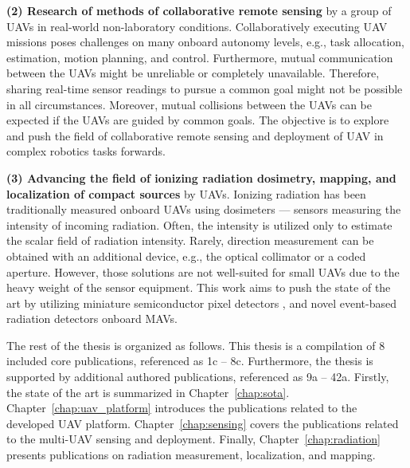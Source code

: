 \documentclass[a4paper,11pt,twoside,openright]{book}
\begin{document}
\textbf{(2) Research of methods of collaborative remote sensing} by a group of \aclp{UAV} in real-world non-laboratory conditions.
Collaboratively executing UAV missions poses challenges on many onboard autonomy levels, e.g., task allocation, estimation, motion planning, and control.
Furthermore, mutual communication between the \acp{UAV} might be unreliable or completely unavailable.
Therefore, sharing real-time sensor readings to pursue a common goal might not be possible in all circumstances.
Moreover, mutual collisions between the \acp{UAV} can be expected if the \acp{UAV} are guided by common goals.
The objective is to explore and push the field of collaborative remote sensing and deployment of \ac{UAV} in complex robotics tasks forwards.

\textbf{(3) Advancing the field of ionizing radiation dosimetry, mapping, and localization of compact sources} by \aclp{UAV}.
Ionizing radiation has been traditionally measured onboard \acp{UAV} using dosimeters \cite{nagatani2013emergency, sanada2015aerial, towler2012radiation, jiang2016prototype} --- sensors measuring the intensity of incoming radiation.
Often, the intensity is utilized only to estimate the scalar field of radiation intensity.
Rarely, direction measurement can be obtained with an additional device, e.g., the optical collimator or a coded aperture.
However, those solutions are not well-suited for small \acp{UAV} due to the heavy weight of the sensor equipment.
This work aims to push the state of the art by utilizing miniature semiconductor pixel detectors \cite{llopart2007timepix}, and novel event-based radiation detectors \cite{poikela2014timepix3} onboard \acp{MAV}.

The rest of the thesis is organized as follows.
This thesis is a compilation of 8 included core publications, referenced as 1c -- 8c.
Furthermore, the thesis is supported by additional authored publications, referenced as 9a -- 42a.
Firstly, the state of the art is summarized in Chapter~\ref{chap:sota}.
Chapter~\ref{chap:uav_platform} introduces the publications related to the developed \ac{UAV} platform.
Chapter~\ref{chap:sensing} covers the publications related to the multi-\ac{UAV} sensing and deployment.
Finally, Chapter~\ref{chap:radiation} presents publications on radiation measurement, localization, and mapping.



\end{document}
